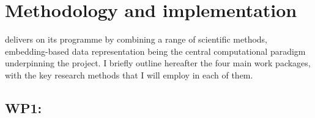 %



\section{Methodology and implementation}

\project delivers on its programme by combining a range of scientific methods,
embedding-based data representation being the central computational paradigm
underpinning the project.  I briefly outline hereafter the four main work
packages, with the key research methods that I will employ in each of them.








\subsection{WP1: \textbf{\WPA} 
           {\newline\footnotesize{}}}

